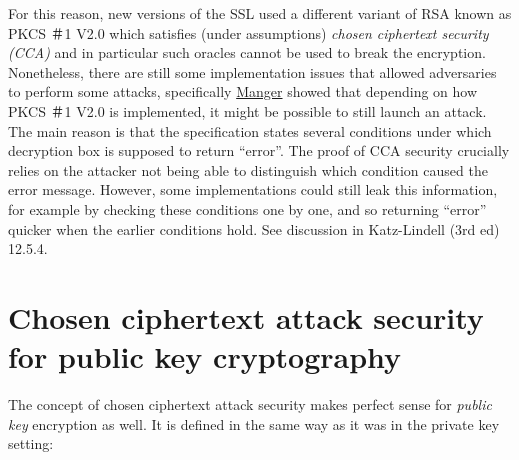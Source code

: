 For this reason, new versions of the SSL used a different variant of RSA
known as PKCS ＃1 V2.0 which satisfies (under assumptions) \emph{chosen
ciphertext security (CCA)} and in particular such oracles cannot be used
to break the encryption. Nonetheless, there are still some
implementation issues that allowed adversaries to perform some attacks,
specifically
\href{http://archiv.infsec.ethz.ch/education/fs08/secsem/Manger01.pdf}{Manger}
showed that depending on how PKCS ＃1 V2.0 is implemented, it might be
possible to still launch an attack. The main reason is that the
specification states several conditions under which decryption box is
supposed to return ``error''. The proof of CCA security crucially relies
on the attacker not being able to distinguish which condition caused the
error message. However, some implementations could still leak this
information, for example by checking these conditions one by one, and so
returning ``error'' quicker when the earlier conditions hold. See
discussion in Katz-Lindell (3rd ed) 12.5.4.

\section{Chosen ciphertext attack security for public key
cryptography}\label{12-Chosen-ciphertext-atta}

The concept of chosen ciphertext attack security makes perfect sense for
\emph{public key} encryption as well. It is defined in the same way as
it was in the private key setting:

\hypertarget{CCSpubdef}{}

